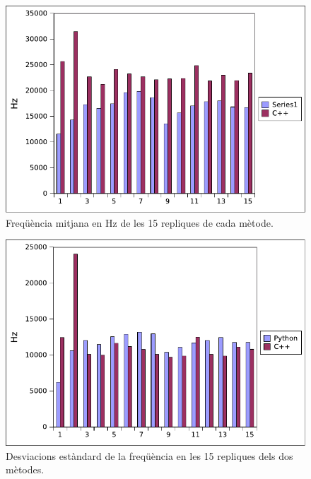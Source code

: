 \documentclass[12pt,a4paper,final,twoside]{article}
\begin{document}
\begin{figure}[h!]
	\centering
    \includegraphics[scale=1]{images/MitJoint.pdf}
	 \caption{Freqüència mitjana en Hz de les 15 repliques de cada mètode.}
  \label{fig:MitJoint}
\end{figure}
\begin{figure}[h!]
	\centering
    \includegraphics[scale=1]{images/DevJoint.pdf}
	 \caption{Desviacions estàndard de la freqüència en les 15 repliques dels dos mètodes.}
  \label{fig:DevJoint}
\end{figure}
\end{document}
